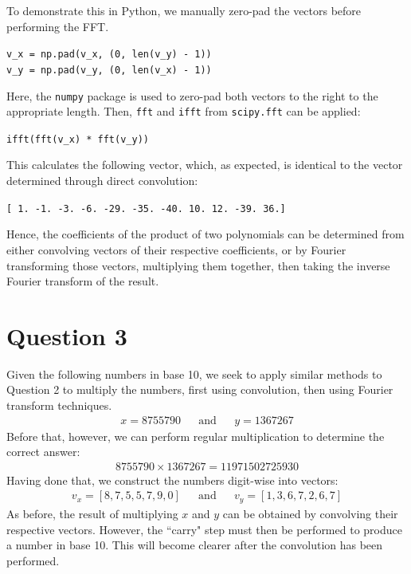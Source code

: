 \documentclass[a4paper, 11pt]{article}
\begin{document}
To demonstrate this in Python, we manually zero-pad the vectors before
performing the FFT.
\begin{center}
    \texttt{v\_x = np.pad(v\_x, (0, len(v\_y) - 1))} \\
    \texttt{v\_y = np.pad(v\_y, (0, len(v\_x) - 1))}
\end{center}
Here, the \texttt{numpy} package is used to zero-pad both vectors to the right
to the appropriate length. Then, \texttt{fft} and \texttt{ifft} from
\texttt{scipy.fft} can be applied:
\begin{center}
    \texttt{ifft(fft(v\_x) * fft(v\_y))}
\end{center}
This calculates the following vector, which, as expected, is identical to the
vector determined through direct convolution:
\begin{center}
    \texttt{[  1.  -1.  -3.  -6. -29. -35. -40.  10.  12. -39.  36.]}
\end{center}
Hence, the coefficients of the product of two polynomials can be determined from
either convolving vectors of their respective coefficients, or by Fourier
transforming those vectors, multiplying them together, then taking the inverse
Fourier transform of the result.

\newpage
\section*{Question 3}

Given the following numbers in base 10, we seek to apply similar methods to
Question 2 to multiply the numbers, first using convolution, then using Fourier
transform techniques.
\begin{align*}
    x = 8755790 && \text{and} && y = 1367267
\end{align*}
Before that, however, we can perform regular multiplication to determine the
correct answer:
\begin{align*}
    8755790 \times 1367267 = 11971502725930
\end{align*}
Having done that, we construct the numbers digit-wise into vectors:
\begin{align*}
    v_x = [8, 7, 5, 5, 7, 9, 0] && \text{and} && v_y = [1, 3, 6, 7, 2, 6, 7]
\end{align*}
As before, the result of multiplying $x$ and $y$ can be obtained by convolving
their respective vectors. However, the ``carry" step must then be performed to
produce a number in base 10. This will become clearer after the convolution has
been performed.
\end{document}
